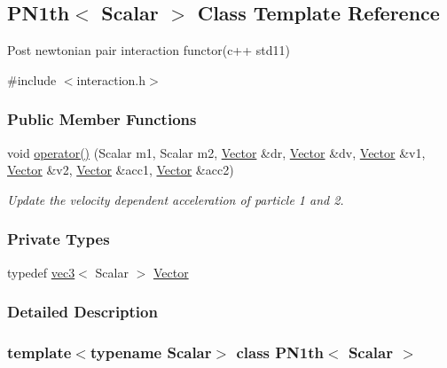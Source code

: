 \hypertarget{class_p_n1th}{}\subsection{P\+N1th$<$ Scalar $>$ Class Template Reference}
\label{class_p_n1th}


Post newtonian pair interaction functor(c++ std11)  




{\ttfamily \#include $<$interaction.\+h$>$}

\subsubsection*{Public Member Functions}
\begin{DoxyCompactItemize}
\item 
void \mbox{\hyperlink{class_p_n1th_a1ed48e417256ef44bf6faa3e7c433b7e}{operator()}} (Scalar m1, Scalar m2, \mbox{\hyperlink{class_p_n1th_affb0517b66197be4e03c50d632f35c3f}{Vector}} \&dr, \mbox{\hyperlink{class_p_n1th_affb0517b66197be4e03c50d632f35c3f}{Vector}} \&dv, \mbox{\hyperlink{class_p_n1th_affb0517b66197be4e03c50d632f35c3f}{Vector}} \&v1, \mbox{\hyperlink{class_p_n1th_affb0517b66197be4e03c50d632f35c3f}{Vector}} \&v2, \mbox{\hyperlink{class_p_n1th_affb0517b66197be4e03c50d632f35c3f}{Vector}} \&acc1, \mbox{\hyperlink{class_p_n1th_affb0517b66197be4e03c50d632f35c3f}{Vector}} \&acc2)
\begin{DoxyCompactList}\small\item\em Update the velocity dependent acceleration of particle 1 and 2. \end{DoxyCompactList}\end{DoxyCompactItemize}
\subsubsection*{Private Types}
\begin{DoxyCompactItemize}
\item 
typedef \mbox{\hyperlink{structvec3}{vec3}}$<$ Scalar $>$ \mbox{\hyperlink{class_p_n1th_affb0517b66197be4e03c50d632f35c3f}{Vector}}
\end{DoxyCompactItemize}


\subsubsection{Detailed Description}
\subsubsection*{template$<$typename Scalar$>$\newline
class P\+N1th$<$ Scalar $>$}

